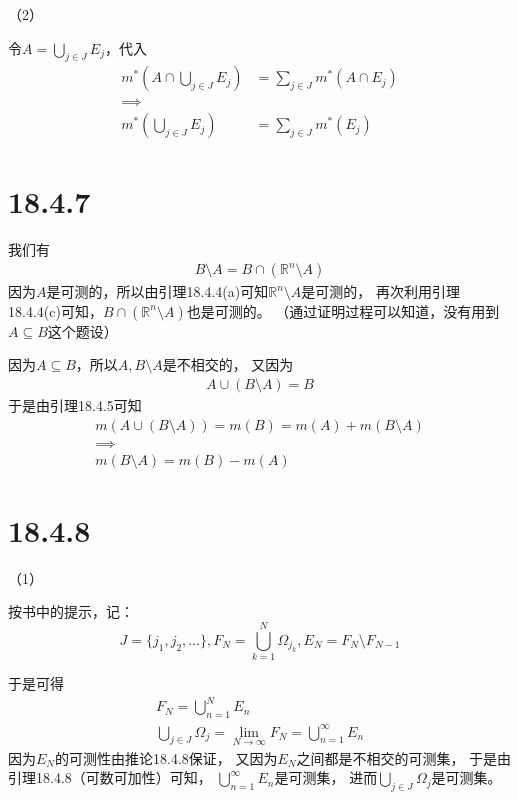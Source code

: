 \documentclass{article}
\begin{document}
（2）

令$A = \bigcup\limits_{j \in J} E_j$，代入
\begin{align*}
  m^{\ast}(A \cap \bigcup\limits_{j \in J} E_j) & = \sum\limits_{j \in J} m^{\ast}(A \cap E_{j}) \\
  \implies                                                                                       \\
  m^{\ast}(\bigcup\limits_{j \in J} E_j)        & = \sum\limits_{j \in J} m^{\ast}(E_{j})
\end{align*}

\section*{18.4.7}

我们有
\begin{align*}
  B \setminus A = B \cap (\mathbb{R}^n \setminus A)
\end{align*}
因为$A$是可测的，所以由引理18.4.4(a)可知$\mathbb{R}^n \setminus A$是可测的，
再次利用引理18.4.4(c)可知，$B \cap (\mathbb{R}^n \setminus A)$也是可测的。
（通过证明过程可以知道，没有用到$A \subseteq B$这个题设）

因为$A \subseteq B$，所以$A, B \setminus A$是不相交的，
又因为
\begin{align*}
  A \cup (B \setminus A) = B
\end{align*}
于是由引理18.4.5可知
\begin{align*}
  m(A \cup (B \setminus A)) = m(B) = m(A) + m(B \setminus A) \\
  \implies                                                   \\
  m(B \setminus A) = m(B) - m(A)
\end{align*}

\section*{18.4.8}

（1）

按书中的提示，记：
\[
  J = \{j_1, j_2, \dots\},
  F_N = \bigcup\limits_{k = 1}^N \Omega_{j_k},
  E_N = F_{N} \setminus F_{N - 1}
\]

于是可得
\begin{align*}
  F_N = \bigcup \limits_{n = 1}^N E_n \\
  \bigcup\limits_{j \in J} \Omega_{j} = \lim\limits_{N \to \infty} F_N = \bigcup \limits_{n = 1}^\infty E_n
\end{align*}
因为$E_N$的可测性由推论18.4.8保证，
又因为$E_N$之间都是不相交的可测集，
于是由引理18.4.8（可数可加性）可知，
$\bigcup \limits_{n = 1}^\infty E_n$是可测集，
进而$\bigcup\limits_{j \in J} \Omega_{j}$是可测集。
\end{document}
